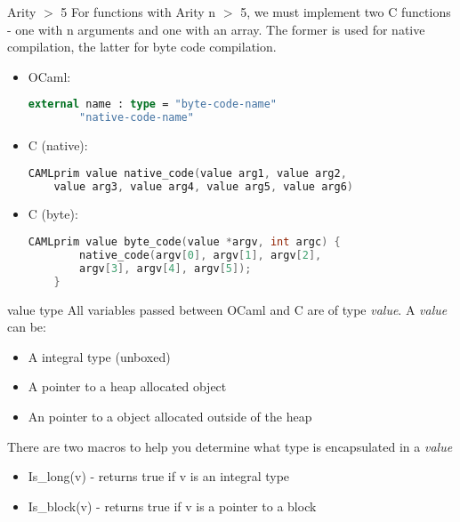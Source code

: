 \documentclass{beamer}
\begin{document}
\begin{frame}[fragile,shrink=15]{Arity $>$ 5}
For functions with Arity n $>$ 5, we must implement two C functions - one
with n arguments and one with an array.  The former is used for native compilation,
the latter for byte code compilation.
\begin{itemize}
    \item OCaml:
    \begin{lstlisting}[language=ML]
    external name : type = "byte-code-name"
        "native-code-name"
    \end{lstlisting}
    \item C (native):
    \begin{lstlisting}[language=C]
    CAMLprim value native_code(value arg1, value arg2,
    value arg3, value arg4, value arg5, value arg6)
    \end{lstlisting}
    \item C (byte):
    \begin{lstlisting}[language=C]
    CAMLprim value byte_code(value *argv, int argc) {
        native_code(argv[0], argv[1], argv[2],
        argv[3], argv[4], argv[5]);
    }
    \end{lstlisting}
\end{itemize}
\end{frame}

\begin{frame}{value type}
All variables passed between OCaml and C are of type \emph{value}.  A \emph{value} can be:
\begin{itemize} \item A integral type (unboxed) \item A pointer to a heap allocated object
    \item An pointer to a object allocated outside of the heap
\end{itemize}
There are two macros to help you determine what type is encapsulated in a \emph{value}
\begin{itemize}
    \item Is\_long(v) - returns true if v is an integral type
    \item Is\_block(v) - returns true if v is a pointer to a block
\end{itemize}
\end{frame}
\end{document}

